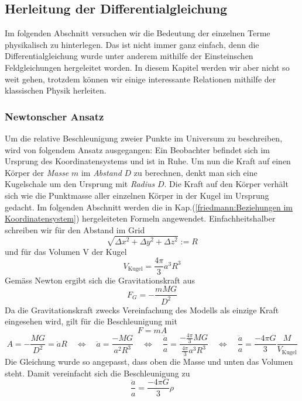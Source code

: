 \begin{refsection}
\subsection{Herleitung der Differentialgleichung}
Im folgenden Abschnitt versuchen wir die Bedeutung der einzelnen Terme physikalisch zu hinterlegen. Das ist nicht immer ganz einfach, denn die Differentialgleichung wurde unter anderem mithilfe der Einsteinschen Feldgleichungen hergeleitet worden. In diesem Kapitel werden wir aber nicht so weit gehen, trotzdem können wir einige interessante Relationen mithilfe der klassischen Physik herleiten.
\subsubsection{Newtonscher Ansatz}
Um die relative Beschleunigung zweier Punkte im Universum zu beschreiben, wird von folgendem Ansatz ausgegangen: Ein Beobachter befindet sich im Ursprung des Koordinatensystems und ist in Ruhe. Um nun die Kraft auf einen Körper der {\em Masse} $m$ im {\em Abstand} $D$ zu berechnen, denkt man sich eine Kugelschale um den Ursprung mit {\em Radius} $D$. Die Kraft auf den Körper verhält sich wie die Punktmasse aller  einzelnen Körper in der Kugel im Ursprung gedacht.
Im folgenden Abschnitt werden die in Kap.(\ref{friedmann:Beziehungen im Koordinatensystem}) hergeleiteten Formeln angewendet. Einfachheitshalber schreiben wir für den Abstand im Grid
\[ \sqrt{\Delta x^2 + \Delta y^2 + \Delta z^2} := R \]
und für das Volumen V der Kugel
\[V_\text{Kugel} = \frac{4 \pi }{3} a^3 R^3\]
Gemäss Newton ergibt sich die Gravitationskraft aus
\begin{equation}
F_G = -\frac{m M G}{D^2}
\end{equation}
Da die Gravitationskraft zwecks Vereinfachung des Modells als einzige Kraft eingesehen wird, gilt für die Beschleunigung mit 
\[F = m A\]
\[A = - \frac{M G}{D^2} = \ddot{a} R \quad\Leftrightarrow\quad \ddot{a} = \frac{- M G}{a^2 R^3} \quad\Leftrightarrow\quad \frac{\ddot{a}}{a} = \frac{-\frac{4 \pi }{3} M G}{\frac{4 \pi}{3}a^3 R^3} \quad\Leftrightarrow\quad \frac{\ddot{a}}{a} = \frac{- 4 \pi G}{3} \frac{M}{V_\text{Kugel}}\]
Die Gleichung wurde so angepasst, dass oben die Masse und unten das Volumen steht. Damit vereinfacht sich die Beschleunigung zu
\begin{equation}
\frac{\ddot{a}}{a} = \frac{- 4 \pi G}{3} \rho
\end{equation}

\end{refsection}
